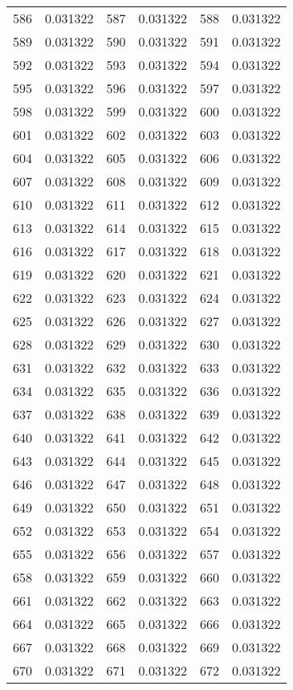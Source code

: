 \documentclass[12pt]{article}
\begin{document}
\begin{longtable}{@{}cc|cc|cc@{}}
586 & 0.031322 & 587 & 0.031322 & 588 & 0.031322 \\
589 & 0.031322 & 590 & 0.031322 & 591 & 0.031322 \\
592 & 0.031322 & 593 & 0.031322 & 594 & 0.031322 \\
595 & 0.031322 & 596 & 0.031322 & 597 & 0.031322 \\
598 & 0.031322 & 599 & 0.031322 & 600 & 0.031322 \\
601 & 0.031322 & 602 & 0.031322 & 603 & 0.031322 \\
604 & 0.031322 & 605 & 0.031322 & 606 & 0.031322 \\
607 & 0.031322 & 608 & 0.031322 & 609 & 0.031322 \\
610 & 0.031322 & 611 & 0.031322 & 612 & 0.031322 \\
613 & 0.031322 & 614 & 0.031322 & 615 & 0.031322 \\
616 & 0.031322 & 617 & 0.031322 & 618 & 0.031322 \\
619 & 0.031322 & 620 & 0.031322 & 621 & 0.031322 \\
622 & 0.031322 & 623 & 0.031322 & 624 & 0.031322 \\
625 & 0.031322 & 626 & 0.031322 & 627 & 0.031322 \\
628 & 0.031322 & 629 & 0.031322 & 630 & 0.031322 \\
631 & 0.031322 & 632 & 0.031322 & 633 & 0.031322 \\
634 & 0.031322 & 635 & 0.031322 & 636 & 0.031322 \\
637 & 0.031322 & 638 & 0.031322 & 639 & 0.031322 \\
640 & 0.031322 & 641 & 0.031322 & 642 & 0.031322 \\
643 & 0.031322 & 644 & 0.031322 & 645 & 0.031322 \\
646 & 0.031322 & 647 & 0.031322 & 648 & 0.031322 \\
649 & 0.031322 & 650 & 0.031322 & 651 & 0.031322 \\
652 & 0.031322 & 653 & 0.031322 & 654 & 0.031322 \\
655 & 0.031322 & 656 & 0.031322 & 657 & 0.031322 \\
658 & 0.031322 & 659 & 0.031322 & 660 & 0.031322 \\
661 & 0.031322 & 662 & 0.031322 & 663 & 0.031322 \\
664 & 0.031322 & 665 & 0.031322 & 666 & 0.031322 \\
667 & 0.031322 & 668 & 0.031322 & 669 & 0.031322 \\
670 & 0.031322 & 671 & 0.031322 & 672 & 0.031322 \\

\end{longtable}
\end{document}
